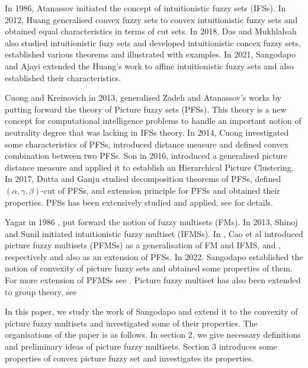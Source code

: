 \documentclass[12pt,letterpaper]{amsart}
\theoremstyle{plain}
\theoremstyle{definition}
\numberwithin{equation}{section}
\begin{document}
In 1986, Atanassov \cite{a1} initiated the concept of intuitionistic fuzzy sets (IFSs). In 2012, Huang \cite{h} generalised convex fuzzy sets to convex intuitionistic fuzzy sets and obtained equal characteristics in terms of cut sets. In 2018, Das and Mukhlalsah \cite{dm} also studied intuitionistic fuzy sets and developed intuitionistic concex fuzzy sets, established various theorems and illustrated with examples. In 2021, Sangodapo and Ajayi \cite{sa2} extended the Huang's work to affine intuitionistic fuzzy sets and also established their characteristics.

Cuong and Kreinovich \cite{ck} in 2013, generalised Zadeh and Atanassov's works by putting forward the theory of Picture fuzzy sets (PFSs). This theory is a new concept for computational intelligence problems to handle an important notion of neutrality degree that was lacking in IFSs theory. In 2014, Cuong \cite{c3} investigated some characteristics of PFSs, introduced distance measure and defined convex combination between two PFSs. Son \cite{s} in 2016, introduced a generalised picture distance measure and applied it to establish an Hierarchical Picture Clustering. In 2017, Dutta and Ganju \cite{dg} studied decomposition theorems of PFSs, defined $(\alpha, \gamma, \beta)$-cut of PFSs, and extension principle for PFSs and obtained their properties. PFSs has been extensively studied and applied, see \cite{dg, dp, g, tkc} for details.

Yagar in 1986 \cite{ya}, put forward the notion of fuzzy multisets (FMs). In 2013, Shinoj and Sunil \cite{ss1} initiated intuitionistic fuzzy multiset (IFMSs). In \cite{cfs}, Cao et al introduced picture fuzzy multisets (PFMSs) as a generalisation of FM and IFMS, \cite{ya} and \cite{ss1}, respectively and also as an extension of PFSs. In 2022. Sangodapo \cite{s} established the notion of convexity of picture fuzzy sets and obtained some properties of them. For more extension of PFMSs see \cite{d1, d2, d3}. Picture fuzzy multiset has also been extended to group theory, see \cite{t2, d4, sg, sy, p, tb}

In this paper, we study the work of Sangodapo \cite{s1} and extend it to the convexity of picture fuzzy multisets and investigated some of their properties.
The organisations of the paper is as follows. In section 2, we give necessary definitions and preliminary ideas of picture fuzzy multisets. Section 3 introduces some properties of convex picture fuzzy set and investigates its properties.  
\ \\
\end{document}
